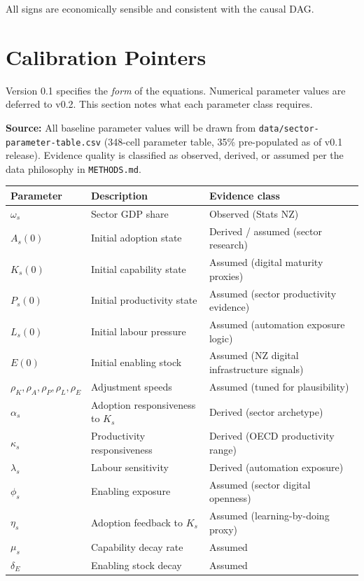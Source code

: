 \documentclass[11pt,a4paper]{article}
\begin{document}
All signs are economically sensible and consistent with the causal DAG.

\section{Calibration Pointers}

Version 0.1 specifies the \emph{form} of the equations. Numerical parameter values are deferred to v0.2. This section notes what each parameter class requires.

\textbf{Source:} All baseline parameter values will be drawn from \texttt{data/sector-parameter-table.csv} (348-cell parameter table, 35\% pre-populated as of v0.1 release). Evidence quality is classified as observed, derived, or assumed per the data philosophy in \texttt{METHODS.md}.

\begin{center}
\begin{tabular}{lll}
\toprule
Parameter & Description & Evidence class \\
\midrule
$\omega_s$ & Sector GDP share & Observed (Stats NZ) \\
$A_s(0)$ & Initial adoption state & Derived / assumed (sector research) \\
$K_s(0)$ & Initial capability state & Assumed (digital maturity proxies) \\
$P_s(0)$ & Initial productivity state & Assumed (sector productivity evidence) \\
$L_s(0)$ & Initial labour pressure & Assumed (automation exposure logic) \\
$E(0)$ & Initial enabling stock & Assumed (NZ digital infrastructure signals) \\
$\rho_K, \rho_A, \rho_P, \rho_L, \rho_E$ & Adjustment speeds & Assumed (tuned for plausibility) \\
$\alpha_s$ & Adoption responsiveness to $K_s$ & Derived (sector archetype) \\
$\kappa_s$ & Productivity responsiveness & Derived (OECD productivity range) \\
$\lambda_s$ & Labour sensitivity & Derived (automation exposure) \\
$\phi_s$ & Enabling exposure & Assumed (sector digital openness) \\
$\eta_s$ & Adoption feedback to $K_s$ & Assumed (learning-by-doing proxy) \\
$\mu_s$ & Capability decay rate & Assumed \\
$\delta_E$ & Enabling stock decay & Assumed \\
\bottomrule
\end{tabular}
\end{center}
\end{document}
